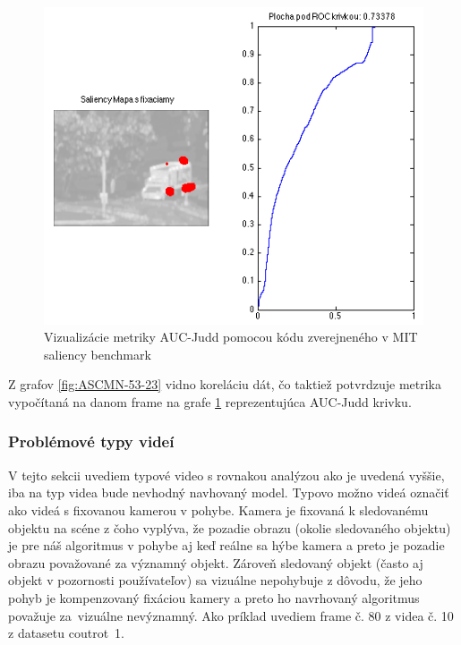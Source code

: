 \begin{figure}[H]
  \centering
  \includegraphics[width=14cm]{pics/ACCV-23-54-AUC_Judd.png}
  \caption{Vizualizácie metriky AUC-Judd pomocou kódu zverejneného v MIT saliency benchmark\cite{mit-saliency-benchmark}}
  \label{fig:ASCMN-53-23-AUC}
  \vspace{10mm}
\end{figure}

Z grafov \ref{fig:ASCMN-53-23} vidno koreláciu dát, čo taktiež potvrdzuje metrika vypočítaná na danom frame na grafe \ref{fig:ASCMN-53-23-AUC} reprezentujúca AUC-Judd\cite{auc-judd} krivku.

\subsubsection{Problémové typy videí}
V tejto sekcii uvediem typové video s rovnakou analýzou ako je uvedená vyššie, iba na typ videa bude nevhodný navhovaný model.
Typovo možno videá označiť ako videá s fixovanou kamerou v pohybe.
Kamera je fixovaná k sledovanému objektu na scéne z čoho vyplýva, že pozadie obrazu (okolie sledovaného objektu) je pre náš algoritmus v pohybe aj keď reálne sa hýbe kamera a preto je pozadie obrazu považované za významný objekt.
Zároveň sledovaný objekt (často aj objekt v pozornosti používateľov) sa vizuálne nepohybuje z dôvodu, že jeho pohyb je kompenzovaný fixáciou kamery a preto ho navrhovaný algoritmus považuje za~vizuálne nevýznamný.
Ako príklad uvediem frame č. 80 z videa č. 10 z datasetu coutrot~1.

